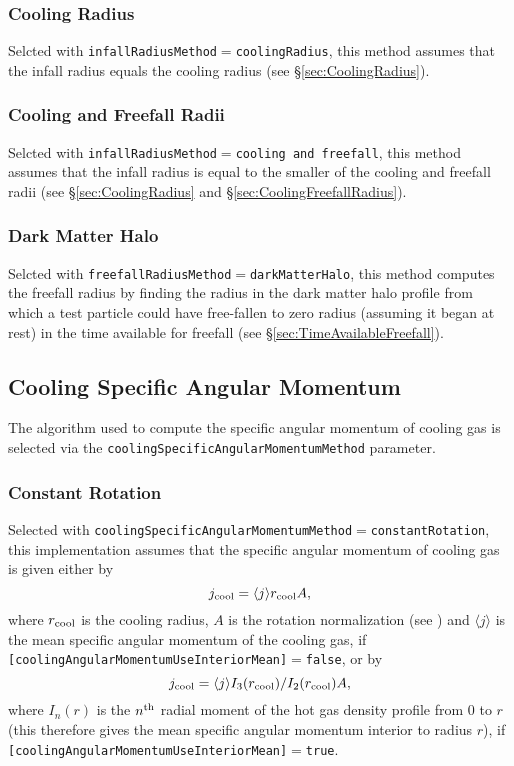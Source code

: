 \subsubsection{Cooling Radius}

Selcted with {\tt infallRadiusMethod}$=${\tt coolingRadius}, this method assumes that the infall radius equals the cooling radius (see \S\ref{sec:CoolingRadius}).

\subsubsection{Cooling and Freefall Radii}

Selcted with {\tt infallRadiusMethod}$=${\tt cooling and freefall}, this method assumes that the infall radius is equal to the smaller of the cooling and freefall radii (see \S\ref{sec:CoolingRadius} and \S\ref{sec:CoolingFreefallRadius}).

\subsubsection{Dark Matter Halo}

Selcted with {\tt freefallRadiusMethod}$=${\tt darkMatterHalo}, this method computes the freefall radius by finding the radius in the dark matter halo profile from which a test particle could have free-fallen to zero radius (assuming it began at rest) in the time available for freefall (see \S\ref{sec:TimeAvailableFreefall}).

\subsection{Cooling Specific Angular Momentum}

The algorithm used to compute the specific angular momentum of cooling gas is selected via the {\tt coolingSpecificAngularMomentumMethod} parameter.

\subsubsection{Constant Rotation}

Selected with {\tt coolingSpecificAngularMomentumMethod}$=${\tt constantRotation}, this implementation assumes that the specific angular momentum of cooling gas is given either by
\begin{equation}
 j_{\rm cool} = \langle j \rangle r_{\rm cool} A,
\end{equation}
where $r_{\rm cool}$ is the cooling radius, $A$ is the rotation normalization (see ) and $\langle j \rangle$ is the mean specific angular momentum of the cooling gas, if {\tt [coolingAngularMomentumUseInteriorMean]}$=${\tt false}, or by
\begin{equation}
 j_{\rm cool} = \langle j \rangle {I_3(r_{\rm cool})/I_2(r_{\rm cool})} A,
\end{equation}
where $I_n(r)$ is the $n^{\rm th}$ radial moment of the hot gas density profile from $0$ to $r$ (this therefore gives the mean specific angular momentum interior to radius $r$), if {\tt [coolingAngularMomentumUseInteriorMean]}$=${\tt true}.

